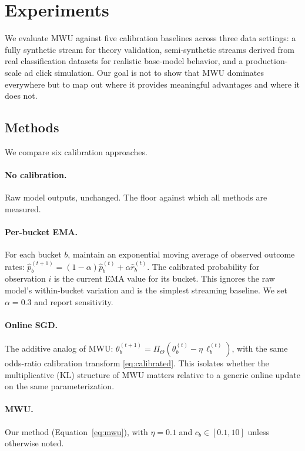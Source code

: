 \documentclass[12pt, letterpaper]{article}
\theoremstyle{definition}
\theoremstyle{remark}
\begin{document}
\section{Experiments}
\label{sec:experiments}

We evaluate MWU against five calibration baselines across three data settings: a fully synthetic stream for theory validation, semi-synthetic streams derived from real classification datasets for realistic base-model behavior, and a production-scale ad click simulation. Our goal is not to show that MWU dominates everywhere but to map out where it provides meaningful advantages and where it does not.

\subsection{Methods}

We compare six calibration approaches.

\paragraph{No calibration.} Raw model outputs, unchanged. The floor against which all methods are measured.

\paragraph{Per-bucket EMA.} For each bucket $b$, maintain an exponential moving average of observed outcome rates: $\hat{p}_b^{(t+1)} = (1-\alpha)\hat{p}_b^{(t)} + \alpha \hat{r}_b^{(t)}$. The calibrated probability for observation $i$ is the current EMA value for its bucket. This ignores the raw model's within-bucket variation and is the simplest streaming baseline. We set $\alpha = 0.3$ and report sensitivity.

\paragraph{Online SGD.} The additive analog of MWU: $\theta_b^{(t+1)} = \Pi_\Theta(\theta_b^{(t)} - \eta\,\ell_b^{(t)})$, with the same odds-ratio calibration transform \eqref{eq:calibrated}. This isolates whether the multiplicative (KL) structure of MWU matters relative to a generic online update on the same parameterization.

\paragraph{MWU.} Our method (Equation~\ref{eq:mwu}), with $\eta = 0.1$ and $c_b \in [0.1, 10]$ unless otherwise noted.
\end{document}
